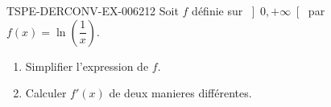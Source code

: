 \begin{exercice}{TSPE-DERCONV-EX-006}{2}{12}
Soit $f$ définie sur $\left]0, +\infty\right[$ par $f(x) = \ln\!\left(\dfrac{1}{x}\right)$.
\begin{enumerate}
  \item Simplifier l'expression de $f$.
  \item Calculer $f'(x)$ de deux manieres différentes.
\end{enumerate}

\end{exercice}
